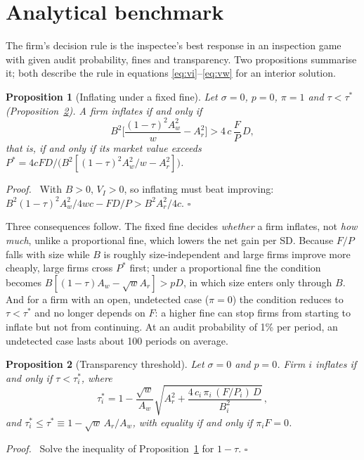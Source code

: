 \documentclass[11pt]{article}
\newtheorem{proposition}{Proposition}
\newenvironment{proofsketch}{\par\noindent\textit{Proof.}\ }{\hfill$\square$\par}
\begin{document}
\section{Analytical benchmark}\label{sec:benchmark}

The firm's decision rule is the inspectee's best response in an inspection game with given audit probability, fines and transparency. Two propositions summarise it; both describe the rule in equations \eqref{eq:vi}--\eqref{eq:vw} for an interior solution.

\begin{proposition}[Inflating under a fixed fine]\label{prop:fixed}
Let $\sigma = 0$, $p = 0$, $\pi = 1$ and $\tau < \tau^*$ (Proposition~\ref{prop:threshold}). A firm inflates if and only if
\[
B^2\Big[\frac{(1-\tau)^2 A_w^2}{w} - A_r^2\Big] > 4\, c\, \frac{F}{P}\, D,
\]
that is, if and only if its market value exceeds $P^* = 4cFD \big/ \big(B^2[(1-\tau)^2A_w^2/w - A_r^2]\big)$.
\end{proposition}
\begin{proofsketch}
With $B>0$, $V_I>0$, so inflating must beat improving: $B^2(1-\tau)^2A_w^2/4wc - FD/P > B^2A_r^2/4c$.
\end{proofsketch}

Three consequences follow. The fixed fine decides \emph{whether} a firm inflates, not \emph{how much}, unlike a proportional fine, which lowers the net gain per SD. Because $F/P$ falls with size while $B$ is roughly size-independent and large firms improve more cheaply, large firms cross $P^*$ first; under a proportional fine the condition becomes $B[(1-\tau)A_w - \sqrt{w}A_r] > pD$, in which size enters only through $B$. And for a firm with an open, undetected case ($\pi = 0$) the condition reduces to $\tau < \tau^*$ and no longer depends on $F$: a higher fine can stop firms from starting to inflate but not from continuing. At an audit probability of 1\% per period, an undetected case lasts about 100 periods on average.

\begin{proposition}[Transparency threshold]\label{prop:threshold}
Let $\sigma = 0$ and $p = 0$. Firm $i$ inflates if and only if $\tau < \tau_i^*$, where
\[
\tau_i^* = 1 - \frac{\sqrt{w}}{A_w}\sqrt{A_r^2 + \frac{4\, c_i\, \pi_i\, (F/P_i)\, D}{B_i^2}}\,,
\]
and $\tau_i^* \le \tau^* \equiv 1 - \sqrt{w}\,A_r/A_w$, with equality if and only if $\pi_i F = 0$.
\end{proposition}
\begin{proofsketch}
Solve the inequality of Proposition~\ref{prop:fixed} for $1-\tau$.
\end{proofsketch}
\end{document}
